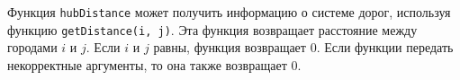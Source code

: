 Функция \texttt{hubDistance} может получить информацию о системе дорог, используя функцию
\texttt{getDistance(i, j)}. Эта функция возвращает расстояние между городами $i$ и $j$. Если $i$ и $j$
равны, функция возвращает $0$. Если функции передать некорректные аргументы, то она также
возвращает $0$.



